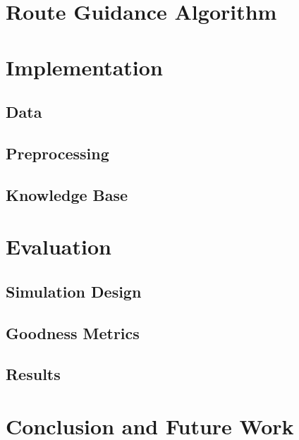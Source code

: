 \documentclass{iitkthesis}
\begin{document}
 \chapter{Route Guidance Algorithm}
 \chapter{Implementation}
 \section{Data}
 \section{Preprocessing}
 \section{Knowledge Base}
 \chapter{Evaluation}
 

 \section{Simulation Design}
 \section{Goodness Metrics}
 \section{Results}
 \chapter{Conclusion and Future Work}


\end{document}
